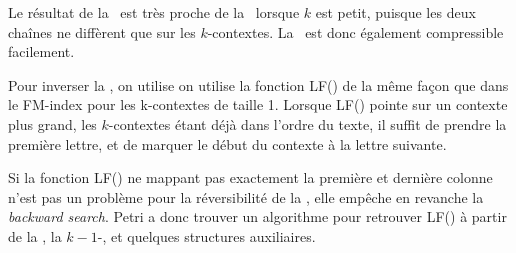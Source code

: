 Le résultat de la \kbwt\ est très proche de la \bwt\ lorsque $k$ est petit, puisque les deux chaînes ne diffèrent que sur les $k$-contextes. La \kbwt\ est donc également compressible facilement.

Pour inverser la \kbwt, on utilise on utilise la fonction LF() de la même façon que dans le FM-index pour les k-contextes de taille 1. Lorsque LF() pointe sur un contexte plus grand, les $k$-contextes étant déjà dans l'ordre du texte, il suffit de prendre la première lettre, et de marquer le début du contexte à la lettre suivante.

Si la fonction LF() ne mappant pas exactement la première et dernière colonne n'est pas un problème pour la réversibilité de la \kbwt, elle empêche en revanche la \textit{backward search}. Petri a donc 
trouver un algorithme pour retrouver LF() à partir de la \kbwt, la $k-1$-\bwt, et quelques structures auxiliaires.
